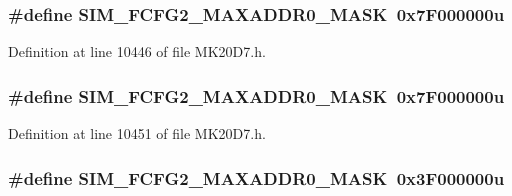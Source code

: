 \subsubsection[{\texorpdfstring{S\+I\+M\+\_\+\+F\+C\+F\+G2\+\_\+\+M\+A\+X\+A\+D\+D\+R0\+\_\+\+M\+A\+SK}{SIM_FCFG2_MAXADDR0_MASK}}]{\setlength{\rightskip}{0pt plus 5cm}\#define S\+I\+M\+\_\+\+F\+C\+F\+G2\+\_\+\+M\+A\+X\+A\+D\+D\+R0\+\_\+\+M\+A\+SK~0x7\+F000000u}\hypertarget{group___s_i_m___register___masks_gad1096c0a75d0bf4dfc93f4b1957fe493}{}\label{group___s_i_m___register___masks_gad1096c0a75d0bf4dfc93f4b1957fe493}


Definition at line 10446 of file M\+K20\+D7.\+h.

\subsubsection[{\texorpdfstring{S\+I\+M\+\_\+\+F\+C\+F\+G2\+\_\+\+M\+A\+X\+A\+D\+D\+R0\+\_\+\+M\+A\+SK}{SIM_FCFG2_MAXADDR0_MASK}}]{\setlength{\rightskip}{0pt plus 5cm}\#define S\+I\+M\+\_\+\+F\+C\+F\+G2\+\_\+\+M\+A\+X\+A\+D\+D\+R0\+\_\+\+M\+A\+SK~0x7\+F000000u}\hypertarget{group___s_i_m___register___masks_gad1096c0a75d0bf4dfc93f4b1957fe493}{}\label{group___s_i_m___register___masks_gad1096c0a75d0bf4dfc93f4b1957fe493}


Definition at line 10451 of file M\+K20\+D7.\+h.

\subsubsection[{\texorpdfstring{S\+I\+M\+\_\+\+F\+C\+F\+G2\+\_\+\+M\+A\+X\+A\+D\+D\+R0\+\_\+\+M\+A\+SK}{SIM_FCFG2_MAXADDR0_MASK}}]{\setlength{\rightskip}{0pt plus 5cm}\#define S\+I\+M\+\_\+\+F\+C\+F\+G2\+\_\+\+M\+A\+X\+A\+D\+D\+R0\+\_\+\+M\+A\+SK~0x3\+F000000u}\hypertarget{group___s_i_m___register___masks_gad1096c0a75d0bf4dfc93f4b1957fe493}{}\label{group___s_i_m___register___masks_gad1096c0a75d0bf4dfc93f4b1957fe493}



